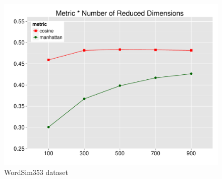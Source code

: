 \documentclass[t]{beamer} %
\begin{document}
\begin{frame}
\begin{columns}
\begin{column}{0.5\textwidth}
      \begin{figure}
        \hspace*{-18pt}   
        \includegraphics[scale=0.30]{img/lapesa_ws_main_metric_n-dim}
        \vspace{-10pt}
        \caption{WordSim353 dataset}
      \end{figure}
      
    \end{column}
  \end{columns}  
  
\end{frame}
\end{document}
